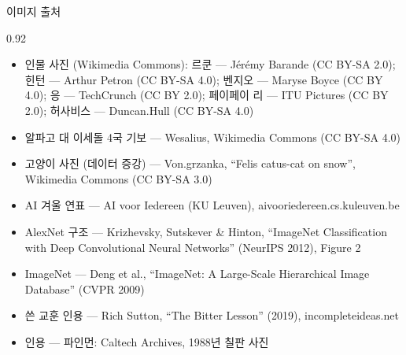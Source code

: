 \documentclass[aspectratio=169,11pt]{beamer}
\begin{document}
\begin{frame}{이미지 출처}
\begin{center}\begin{varwidth}{0.92\textwidth}
  \scriptsize
  \begin{itemize}
    \item 인물 사진 (Wikimedia Commons): 르쿤 --- Jérémy Barande (CC BY-SA 2.0); 힌턴 --- Arthur Petron (CC BY-SA 4.0);
      벤지오 --- Maryse Boyce (CC BY 4.0); 응 --- TechCrunch (CC BY 2.0); 페이페이 리 --- ITU Pictures (CC BY 2.0); 허사비스 --- Duncan.Hull (CC BY-SA 4.0)
    \item 알파고 대 이세돌 4국 기보 --- Wesalius, Wikimedia Commons (CC BY-SA 4.0)
    \item 고양이 사진 (데이터 증강) --- Von.grzanka, ``Felis catus-cat on snow'', Wikimedia Commons (CC BY-SA 3.0)
    \item AI 겨울 연표 --- AI voor Iedereen (KU Leuven), aivooriedereen.cs.kuleuven.be
    \item AlexNet 구조 --- Krizhevsky, Sutskever \& Hinton, ``ImageNet Classification with Deep Convolutional Neural Networks'' (NeurIPS 2012), Figure 2
    \item ImageNet --- Deng et al., ``ImageNet: A Large-Scale Hierarchical Image Database'' (CVPR 2009)
    \item 쓴 교훈 인용 --- Rich Sutton, ``The Bitter Lesson'' (2019), incompleteideas.net
    \item 인용 --- 파인먼: Caltech Archives, 1988년 칠판 사진
  \end{itemize}
\end{varwidth}\end{center}
\end{frame}
\end{document}
